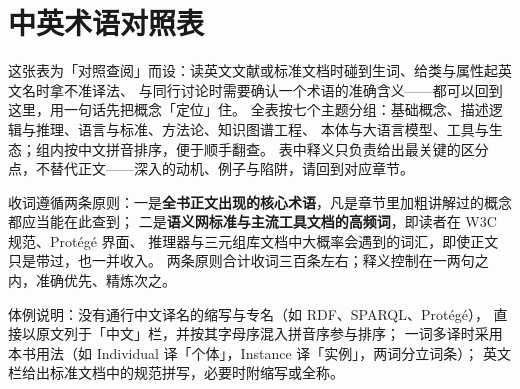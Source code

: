 \color{black}
\chapter{中英术语对照表}

这张表为「对照查阅」而设：读英文文献或标准文档时碰到生词、给类与属性起英文名时拿不准译法、
与同行讨论时需要确认一个术语的准确含义——都可以回到这里，用一句话先把概念「定位」住。
全表按七个主题分组：基础概念、描述逻辑与推理、语言与标准、方法论、知识图谱工程、
本体与大语言模型、工具与生态；组内按中文拼音排序，便于顺手翻查。
表中释义只负责给出最关键的区分点，不替代正文——深入的动机、例子与陷阱，请回到对应章节。

收词遵循两条原则：一是\textbf{全书正文出现的核心术语}，凡是章节里加粗讲解过的概念都应当能在此查到；
二是\textbf{语义网标准与主流工具文档的高频词}，即读者在 W3C 规范、Protégé 界面、
推理器与三元组库文档中大概率会遇到的词汇，即使正文只是带过，也一并收入。
两条原则合计收词三百条左右；释义控制在一两句之内，准确优先、精炼次之。

体例说明：没有通行中文译名的缩写与专名（如 RDF、SPARQL、Protégé），
直接以原文列于「中文」栏，并按其字母序混入拼音序参与排序；
一词多译时采用本书用法（如 Individual 译「个体」，Instance 译「实例」，两词分立词条）；
英文栏给出标准文档中的规范拼写，必要时附缩写或全称。

